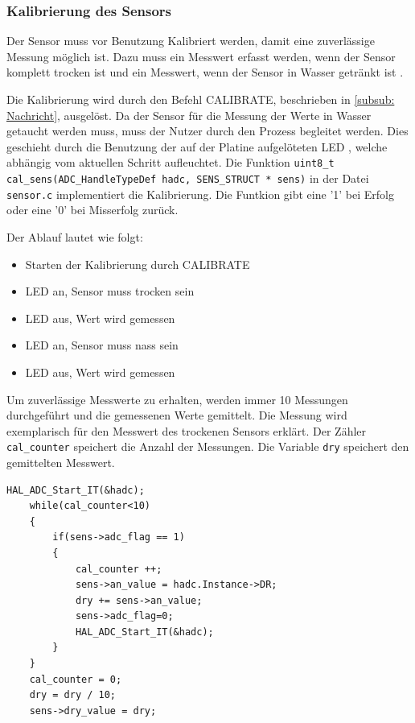   \subsubsection{Kalibrierung des Sensors}

  Der Sensor muss vor Benutzung Kalibriert werden, damit eine zuverlässige Messung möglich ist. Dazu muss ein Messwert erfasst werden, wenn der Sensor komplett trocken
  ist und ein Messwert, wenn der Sensor in Wasser getränkt ist \citep{Sensor}. 

  \smallskip

  Die Kalibrierung wird durch den Befehl CALIBRATE, beschrieben in \ref{subsub: Nachricht}, ausgelöst. Da der Sensor für die Messung der Werte in Wasser getaucht werden muss,
  muss der Nutzer durch den Prozess begleitet werden. Dies geschieht durch die Benutzung der auf der Platine aufgelöteten LED \citep{IoTGateway}, welche abhängig vom aktuellen
  Schritt aufleuchtet. 
  Die Funktion \lstinline!uint8_t cal_sens(ADC_HandleTypeDef hadc, SENS_STRUCT * sens)! in der Datei \lstinline!sensor.c!
  implementiert die Kalibrierung. Die Funtkion gibt eine '1' bei Erfolg oder eine '0' bei Misserfolg zurück.
  
  \smallskip

  Der Ablauf lautet wie folgt:
  \begin{itemize}
      \item Starten der Kalibrierung durch CALIBRATE
      \item LED an, Sensor muss trocken sein
      \item LED aus, Wert wird gemessen
      \item LED an, Sensor muss nass sein
      \item LED aus, Wert wird gemessen 
  \end{itemize}

  Um zuverlässige Messwerte zu erhalten, werden immer 10 Messungen durchgeführt und die gemessenen Werte gemittelt. Die Messung wird exemplarisch für den Messwert des
  trockenen Sensors erklärt. Der Zähler \lstinline!cal_counter! speichert die Anzahl der Messungen. Die Variable \lstinline!dry! speichert den gemittelten Messwert.
  \begin{lstlisting}[caption={\textit{Kalibrationsroutine}}]
    HAL_ADC_Start_IT(&hadc);
    while(cal_counter<10)								
    {
	    if(sens->adc_flag == 1)
        {
            cal_counter ++;
            sens->an_value = hadc.Instance->DR;
            dry += sens->an_value;
            sens->adc_flag=0;
            HAL_ADC_Start_IT(&hadc);
        }
    }
    cal_counter = 0;
    dry = dry / 10;			
    sens->dry_value = dry;
  \end{lstlisting}

